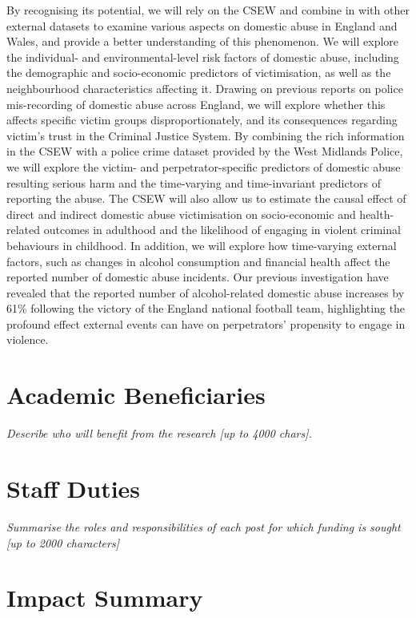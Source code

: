 \documentclass[11pt, a4paper]{article}
\begin{document}
 By recognising its potential, we will rely on the CSEW and combine in with other external datasets to examine various aspects on domestic abuse in England and Wales, and provide a better understanding of this phenomenon. We will explore the individual- and environmental-level risk factors of domestic abuse, including the demographic and socio-economic predictors of victimisation, as well as the neighbourhood characteristics affecting it. Drawing on previous reports on police mis-recording of domestic abuse across England, we will explore whether this affects specific victim groups disproportionately, and its consequences regarding victim's trust in the Criminal Justice System. By combining the rich information in the CSEW with a police crime dataset provided by the West Midlands Police, we will explore the victim- and perpetrator-specific predictors of domestic abuse resulting serious harm and the time-varying and time-invariant predictors of reporting the abuse. The CSEW will also allow us to estimate the causal effect of direct and indirect domestic abuse victimisation on socio-economic and health-related outcomes in adulthood and the likelihood of engaging in violent criminal behaviours in childhood. In addition, we will explore how time-varying external factors, such as changes in alcohol consumption and financial health affect the reported number of domestic abuse incidents. Our previous investigation have revealed that the reported number of alcohol-related domestic abuse increases by 61\% following the victory of the England national football team, highlighting the profound effect external events can have on perpetrators' propensity to engage in violence.





\section{Academic Beneficiaries}

\textit{Describe who will benefit from the research [up to 4000 chars].}

\section{Staff Duties}

\textit{Summarise the roles and responsibilities of each post for which funding is sought [up to 2000 characters]}

\section{Impact Summary }
\end{document}
